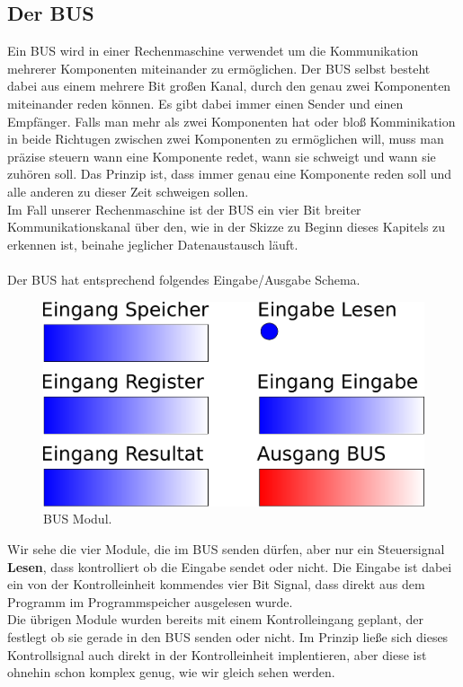 \documentclass[11pt,a4paper,leqno]{report}
\numberwithin{equation}{chapter}
\begin{document}
\subsection{Der BUS}
Ein BUS wird in einer Rechenmaschine verwendet um die Kommunikation mehrerer Komponenten miteinander zu erm\"oglichen. Der BUS selbst besteht dabei aus einem mehrere Bit gro\ss{}en Kanal, durch den genau zwei Komponenten miteinander reden k\"onnen. Es gibt dabei immer einen Sender und einen Empf\"anger. Falls man mehr als zwei Komponenten hat oder blo\ss{} Komminikation in beide Richtugen zwischen zwei Komponenten zu erm\"oglichen will, muss man pr\"azise steuern wann eine Komponente redet, wann sie schweigt und wann sie zuh\"oren soll. Das Prinzip ist, dass immer genau eine Komponente reden soll und alle anderen zu dieser Zeit schweigen sollen.\\
Im Fall unserer Rechenmaschine ist der BUS ein vier Bit breiter Kommunikationskanal \"uber den, wie in der Skizze zu Beginn dieses Kapitels zu erkennen ist, beinahe jeglicher Datenaustausch l\"auft.\\
\\
Der BUS hat entsprechend folgendes Eingabe/Ausgabe Schema.
\begin{figure}[H]
	\begin{center}
		\includegraphics[scale=0.3]{Bilder/_bus.pdf}
		\caption{BUS Modul.}
	\end{center}
\end{figure}
\noindent
Wir sehe die vier Module, die im BUS senden d\"urfen, aber nur ein Steuersignal \textbf{Lesen}, dass kontrolliert ob die Eingabe sendet oder nicht. Die Eingabe ist dabei ein von der Kontrolleinheit kommendes vier Bit Signal, dass direkt aus dem Programm im Programmspeicher ausgelesen wurde.\\
Die \"ubrigen Module wurden bereits mit einem Kontrolleingang geplant, der festlegt ob sie gerade in den BUS senden oder nicht. Im Prinzip lie\ss{}e sich dieses Kontrollsignal auch direkt in der Kontrolleinheit implentieren, aber diese ist ohnehin schon komplex genug, wie wir gleich sehen werden.\\
\end{document}
